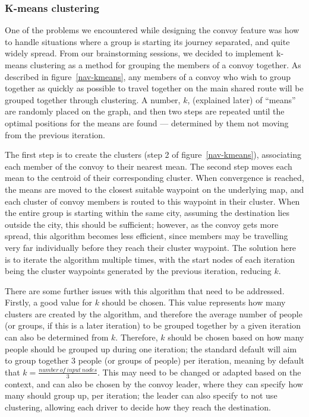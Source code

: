 \documentclass{article}
\begin{document}
\subsubsection{K-means clustering}\label{sssec:nav-tech-kmeans}
One of the problems we encountered while designing the convoy feature was how to handle situations where a group is starting its journey separated, and quite widely spread. From our brainstorming sessions, we decided to implement k-means clustering as a method for grouping the members of a convoy together. As described in figure~\ref{nav-kmeans}, any members of a convoy who wish to group together as quickly as possible to travel together on the main shared route will be grouped together through clustering. A number, $k$, (explained later) of ``means'' are randomly placed on the graph, and then two steps are repeated until the optimal positions for the means are found --- determined by them not moving from the previous iteration.

The first step is to create the clusters (step 2 of figure~\ref{nav-kmeans}), associating each member of the convoy to their nearest mean. The second step moves each mean to the centroid of their corresponding cluster. When convergence is reached, the means are moved to the closest suitable waypoint on the underlying map, and each cluster of convoy members is routed to this waypoint in their cluster. When the entire group is starting within the same city, assuming the destination lies outside the city, this should be sufficient; however, as the convoy gets more spread, this algorithm becomes less efficient, since members may be travelling very far individually before they reach their cluster waypoint. The solution here is to iterate the algorithm multiple times, with the start nodes of each iteration being the cluster waypoints generated by the previous iteration, reducing $k$.

There are some further issues with this algorithm that need to be addressed. Firstly, a good value for $k$ should be chosen. This value represents how many clusters are created by the algorithm, and therefore the average number of people (or groups, if this is a later iteration) to be grouped together by a given iteration can also be determined from $k$. Therefore, $k$ should be chosen based on how many people should be grouped up during one iteration; the standard default will aim to group together 3
%
%
people (or groups of people) per iteration, meaning by default that $k=\frac{number\ of\ input\ nodes}{3}$. This may need to be changed or adapted based on the context, and can also be chosen by the convoy leader, where they can specify how many should group up, per iteration; the leader can also specify to not use clustering, allowing each driver to decide how they reach the destination.
\end{document}
